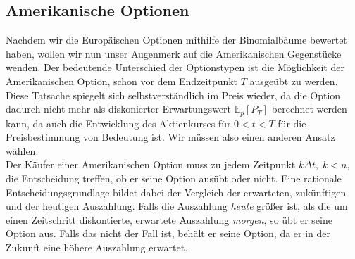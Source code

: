 \subsection{Amerikanische Optionen}              %
\label{cha:BINAmerikanische}                     %
Nachdem wir die Europäischen Optionen mithilfe der Binomialbäume bewertet haben, wollen wir nun unser Augenmerk auf die Amerikanischen Gegenstücke wenden. Der bedeutende Unterschied der Optionstypen ist die Möglichkeit der Amerikanischen Option, schon vor dem Endzeitpunkt $T$ ausgeübt zu werden. Diese Tatsache spiegelt sich selbstverständlich im Preis wieder, da die Option dadurch nicht mehr als diskonierter Erwartungswert $\mathbb{E}_p\left[ P_T \right]$ berechnet werden kann, da auch die Entwicklung des Aktienkurses für $0<t<T$ für die Preisbestimmung von Bedeutung ist.
Wir müssen also einen anderen Ansatz wählen.
\\
Der Käufer einer Amerikanischen Option muss zu jedem Zeitpunkt $k\Delta t,\; k<n,$ die Entscheidung treffen, ob er seine Option ausübt oder nicht. Eine rationale Entscheidungsgrundlage bildet dabei der Vergleich der erwarteten, zukünftigen und der heutigen Auszahlung. Falls die Auszahlung \textit{heute} größer ist, als die um einen Zeitschritt diskontierte, erwartete Auszahlung \textit{morgen}, so übt er seine Option aus. Falls das nicht der Fall ist, behält er seine Option, da  er in der Zukunft eine höhere Auszahlung erwartet.

